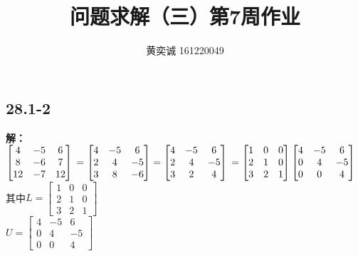\documentclass[twocolumn]{article}
\newenvironment{SChinese}{%
	\CJKfamily{gbsn}%
	\CJKtilde
	\CJKnospace}{}
\begin{document}
	\begin{CJK}{UTF8}{}	
		\begin{SChinese}	
			\title{问题求解（三）第7周作业}
			\author{黄奕诚 161220049}
			\maketitle
			
			\section*{28.1-2}
			\textbf{解：}
				$\left [\begin{matrix}
			4 & -5 & 6 \\
			8 & -6 & 7 \\
			12 & -7 & 12  
			\end{matrix}\right] \newline\newline = \left [\begin{matrix}
			4 & -5 & 6 \\
			2 & 4 & -5 \\
			3 & 8 & -6  
			\end{matrix}\right] = \left [\begin{matrix}
			4 & -5 & 6 \\
			2 & 4 & -5 \\
			3 & 2 & 4  
			\end{matrix}\right] \newline\newline = \left [\begin{matrix}
			1 & 0 & 0 \\
			2 & 1 & 0 \\
			3 & 2 & 1  
			\end{matrix}\right] \left [\begin{matrix}
			4 & -5 & 6 \\
			0 & 4 & -5 \\
			0 & 0 & 4  
			\end{matrix}\right]$\\
			其中$L = \left [\begin{matrix}
			1 & 0 & 0 \\
			2 & 1 & 0 \\
			3 & 2 & 1  
			\end{matrix}\right]$\\
			$U = \left [\begin{matrix}
			4 & -5 & 6 \\
			0 & 4 & -5 \\
			0 & 0 & 4  
			\end{matrix}\right]$

\end{SChinese}
\end{CJK}
\end{document}
